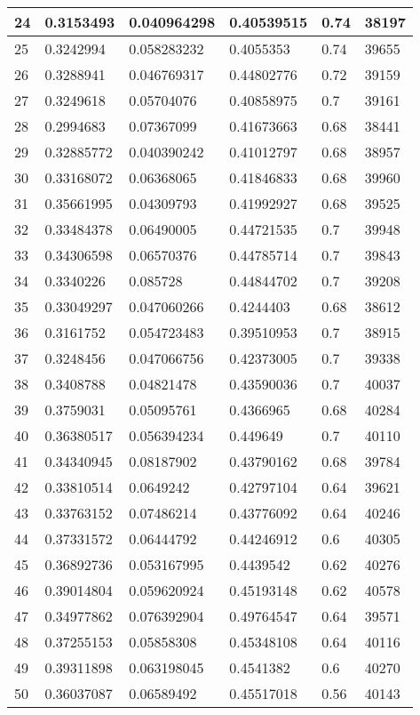 \begin{longtable}{|l|l|l|l|l|l|}
24 & 0.3153493 & 0.040964298 & 0.40539515 & 0.74 & 38197 \\ \hline 
25 & 0.3242994 & 0.058283232 & 0.4055353 & 0.74 & 39655 \\ \hline 
26 & 0.3288941 & 0.046769317 & 0.44802776 & 0.72 & 39159 \\ \hline 
27 & 0.3249618 & 0.05704076 & 0.40858975 & 0.7 & 39161 \\ \hline 
28 & 0.2994683 & 0.07367099 & 0.41673663 & 0.68 & 38441 \\ \hline 
29 & 0.32885772 & 0.040390242 & 0.41012797 & 0.68 & 38957 \\ \hline 
30 & 0.33168072 & 0.06368065 & 0.41846833 & 0.68 & 39960 \\ \hline 
31 & 0.35661995 & 0.04309793 & 0.41992927 & 0.68 & 39525 \\ \hline 
32 & 0.33484378 & 0.06490005 & 0.44721535 & 0.7 & 39948 \\ \hline 
33 & 0.34306598 & 0.06570376 & 0.44785714 & 0.7 & 39843 \\ \hline 
34 & 0.3340226 & 0.085728 & 0.44844702 & 0.7 & 39208 \\ \hline 
35 & 0.33049297 & 0.047060266 & 0.4244403 & 0.68 & 38612 \\ \hline 
36 & 0.3161752 & 0.054723483 & 0.39510953 & 0.7 & 38915 \\ \hline 
37 & 0.3248456 & 0.047066756 & 0.42373005 & 0.7 & 39338 \\ \hline 
38 & 0.3408788 & 0.04821478 & 0.43590036 & 0.7 & 40037 \\ \hline 
39 & 0.3759031 & 0.05095761 & 0.4366965 & 0.68 & 40284 \\ \hline 
40 & 0.36380517 & 0.056394234 & 0.449649 & 0.7 & 40110 \\ \hline 
41 & 0.34340945 & 0.08187902 & 0.43790162 & 0.68 & 39784 \\ \hline 
42 & 0.33810514 & 0.0649242 & 0.42797104 & 0.64 & 39621 \\ \hline 
43 & 0.33763152 & 0.07486214 & 0.43776092 & 0.64 & 40246 \\ \hline 
44 & 0.37331572 & 0.06444792 & 0.44246912 & 0.6 & 40305 \\ \hline 
45 & 0.36892736 & 0.053167995 & 0.4439542 & 0.62 & 40276 \\ \hline 
46 & 0.39014804 & 0.059620924 & 0.45193148 & 0.62 & 40578 \\ \hline 
47 & 0.34977862 & 0.076392904 & 0.49764547 & 0.64 & 39571 \\ \hline 
48 & 0.37255153 & 0.05858308 & 0.45348108 & 0.64 & 40116 \\ \hline 
49 & 0.39311898 & 0.063198045 & 0.4541382 & 0.6 & 40270 \\ \hline 
50 & 0.36037087 & 0.06589492 & 0.45517018 & 0.56 & 40143 \\ \hline 
\end{longtable}